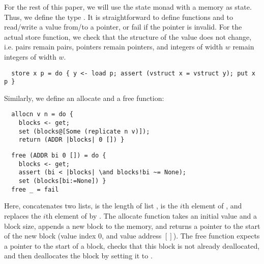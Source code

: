 \documentclass[a4paper,oribibl,envcountsame]{llncs}
\begin{document}
For the rest of this paper, we will use the state monad with a memory as state. Thus, we define the type .
It is straightforward to define functions  and  to read/write a value from/to a pointer, 
or fail if the pointer is invalid.
For the actual store function, we check that the structure of the value does not change, i.e. pairs remain pairs, pointers remain pointers, and integers of width $w$ remain integers of width $w$.
\begin{lstlisting}
  store x p = do { y <- load p; assert (vstruct x = vstruct y); put x p }
\end{lstlisting}
%
% 
% 
%
Similarly, we define an allocate and a free function:\\[-2ex]
\begin{minipage}[t]{.46\textwidth}
\begin{lstlisting}
  allocn v n = do {
    blocks <- get; 
    set (blocks@[Some (replicate n v)]);
    return (ADDR |blocks| 0 []) }
\end{lstlisting}
\end{minipage}
\hfill
\begin{minipage}[t]{.52\textwidth}
\begin{lstlisting}
  free (ADDR bi 0 []) = do {
    blocks <- get; 
    assert (bi < |blocks| \and blocks!bi ~= None);
    set (blocks[bi:=None]) }
  free _ = fail
\end{lstlisting}
\end{minipage}
Here,  concatenates two lists,  is the length of list ,  is the $i$th 
element of , and  replaces the $i$th element of  by .
The allocate function takes an initial value and a block size, appends a new block to the memory, and returns a pointer to the start of the new block (value index $0$, and value address $[]$).
The free function expects a pointer to the start of a block,
checks that this block is not already deallocated, and then deallocates the block by setting it to .
\end{document}

